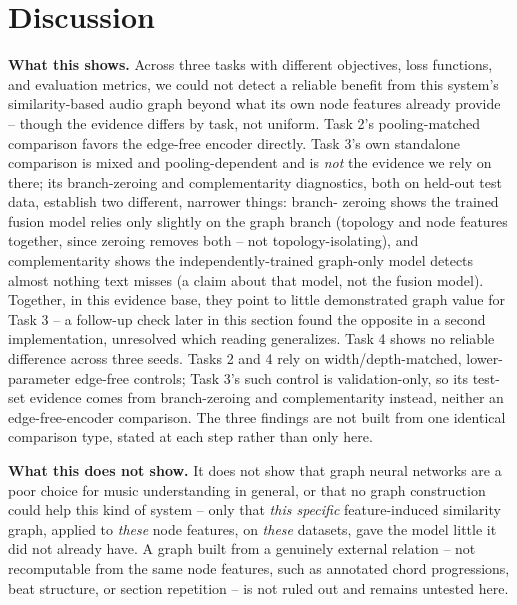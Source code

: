 \section{Discussion}\label{sec:discussion}

\textbf{What this shows.} Across three tasks with different objectives, loss functions, and
evaluation metrics, we could not detect a reliable benefit from this system's
similarity-based audio graph beyond what its own node features already provide -- though the
evidence differs by task, not uniform. Task 2's pooling-matched comparison favors the
edge-free encoder directly. Task 3's own standalone comparison is mixed and pooling-dependent
and is \emph{not} the evidence we rely on there; its branch-zeroing and complementarity
diagnostics, both on held-out test data, establish two different, narrower things: branch-
zeroing shows the trained fusion model relies only slightly on the graph branch (topology and
node features together, since zeroing removes both -- not topology-isolating), and
complementarity shows the independently-trained graph-only model detects almost nothing text
misses (a claim about that model, not the fusion model). Together, in this evidence base,
they point to little demonstrated graph value for Task 3 -- a follow-up check later in this
section found the opposite in a second implementation, unresolved which reading generalizes.
Task 4 shows no reliable difference across three seeds. Tasks 2 and 4 rely on
width/depth-matched, lower-parameter edge-free controls; Task 3's such control is
validation-only, so its test-set evidence comes from branch-zeroing and complementarity
instead, neither an edge-free-encoder comparison. The three findings are not built from one
identical comparison type, stated at each step rather than only here.

\textbf{What this does not show.} It does not show that graph neural networks are a poor
choice for music understanding in general, or that no graph construction could help this
kind of system -- only that \emph{this specific} feature-induced similarity graph, applied to
\emph{these} node features, on \emph{these} datasets, gave the model little it did not
already have. A graph built from a genuinely external relation -- not recomputable from the
same node features, such as annotated chord progressions, beat structure, or section
repetition -- is not ruled out and remains untested here.

